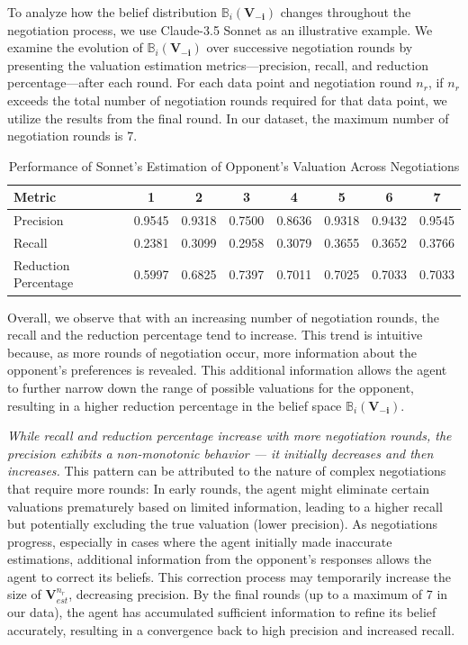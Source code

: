 To analyze how the belief distribution $\mathbb{B}_i(\mathbf{V_{-i}})$ changes throughout the negotiation process, we use Claude-3.5 Sonnet as an illustrative example. We examine the evolution of $\mathbb{B}_i(\mathbf{V_{-i}})$ over successive negotiation rounds by presenting the valuation estimation metrics—precision, recall, and reduction percentage—after each round. For each data point and negotiation round $n_r$, if $n_r$ exceeds the total number of negotiation rounds required for that data point, we utilize the results from the final round. In our dataset, the maximum number of negotiation rounds is 7.

\begin{table}[!ht]
    \centering
    \begin{tabular}{lccccccc}
    \toprule
        Metric & 1 & 2 & 3 & 4 & 5 & 6 & 7\\
        \midrule
        Precision & 0.9545 & 0.9318 & 0.7500 & 0.8636 & 0.9318 & 0.9432 & 0.9545\\
        Recall & 0.2381 & 0.3099 & 0.2958 & 0.3079 & 0.3655 & 0.3652 & 0.3766\\
        Reduction Percentage & 0.5997 & 0.6825 & 0.7397 & 0.7011 & 0.7025 & 0.7033 & 0.7033\\
        \bottomrule
    \end{tabular}
    \caption{Performance of Sonnet's Estimation of Opponent's Valuation Across Negotiations}
    \label{tab:accuracy_across_negotiation}
\end{table}

Overall, we observe that with an increasing number of negotiation rounds, the recall and the reduction percentage tend to increase. This trend is intuitive because, as more rounds of negotiation occur, more information about the opponent's preferences is revealed. This additional information allows the agent to further narrow down the range of possible valuations for the opponent, resulting in a higher reduction percentage in the belief space $\mathbb{B}_i(\mathbf{V_{-i}})$. 

\textit{While recall and reduction percentage increase with more negotiation rounds, the precision exhibits a non-monotonic behavior --- it initially decreases and then increases.} This pattern can be attributed to the nature of complex negotiations that require more rounds: In early rounds, the agent might eliminate certain valuations prematurely based on limited information, leading to a higher recall but potentially excluding the true valuation (lower precision). As negotiations progress, especially in cases where the agent initially made inaccurate estimations, additional information from the opponent's responses allows the agent to correct its beliefs. This correction process may temporarily increase the size of $\mathbf{V}_{est}^{n_r}$, decreasing precision. By the final rounds (up to a maximum of 7 in our data), the agent has accumulated sufficient information to refine its belief accurately, resulting in a convergence back to high precision and increased recall.

